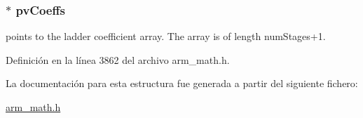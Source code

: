 \subsubsection[{\texorpdfstring{pv\+Coeffs}{pvCoeffs}}]{$\ast$ pv\+Coeffs}\hypertarget{structarm__iir__lattice__instance__q15_a52866ed127c7b2a8a102e2ed1a2ebab8}{}\label{structarm__iir__lattice__instance__q15_a52866ed127c7b2a8a102e2ed1a2ebab8}
points to the ladder coefficient array. The array is of length num\+Stages+1. 

Definición en la línea 3862 del archivo arm\+\_\+math.\+h.



La documentación para esta estructura fue generada a partir del siguiente fichero\+:\begin{DoxyCompactItemize}
\item 
\hyperlink{arm__math_8h}{arm\+\_\+math.\+h}\end{DoxyCompactItemize}

